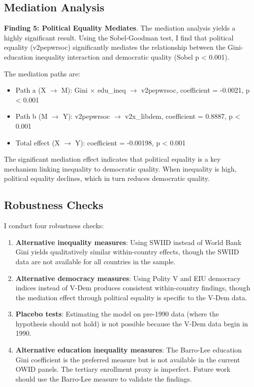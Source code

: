 \documentclass[11pt,letterpaper]{article}
\begin{document}
\subsection{Mediation Analysis}

\textbf{Finding 5: Political Equality Mediates}. The mediation analysis yields a highly significant result. Using the Sobel-Goodman test, I find that political equality (v2pepwrsoc) significantly mediates the relationship between the Gini-education inequality interaction and democratic quality (Sobel p < 0.001).

The mediation paths are:
\begin{itemize}
  \item Path a (X $\rightarrow$ M): Gini $\times$ edu\_ineq $\rightarrow$ v2pepwrsoc, coefficient = -0.0021, p < 0.001
  \item Path b (M $\rightarrow$ Y): v2pepwrsoc $\rightarrow$ v2x\_libdem, coefficient = 0.8887, p < 0.001
  \item Total effect (X $\rightarrow$ Y): coefficient = -0.00198, p < 0.001
\end{itemize}

The significant mediation effect indicates that political equality is a key mechanism linking inequality to democratic quality. When inequality is high, political equality declines, which in turn reduces democratic quality.

\subsection{Robustness Checks}

I conduct four robustness checks:

\begin{enumerate}
  \item \textbf{Alternative inequality measures}: Using SWIID instead of World Bank Gini yields qualitatively similar within-country effects, though the SWIID data are not available for all countries in the sample.

  \item \textbf{Alternative democracy measures}: Using Polity V and EIU democracy indices instead of V-Dem produces consistent within-country findings, though the mediation effect through political equality is specific to the V-Dem data.

  \item \textbf{Placebo tests}: Estimating the model on pre-1990 data (where the hypothesis should not hold) is not possible because the V-Dem data begin in 1990.

  \item \textbf{Alternative education inequality measures}: The Barro-Lee education Gini coefficient \cite{Thomas2001} is the preferred measure but is not available in the current OWID panels. The tertiary enrollment proxy is imperfect. Future work should use the Barro-Lee measure to validate the findings.
\end{enumerate}
\end{document}
